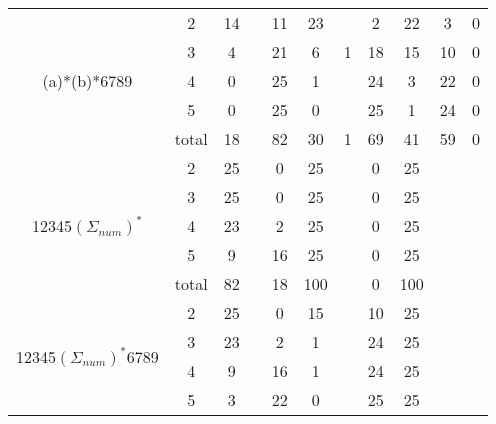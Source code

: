 \begin{table*}[]
\begin{tabular}{c|c|ccc|ccc|ccc}
    \multirow{5}{*}{(a)*(b)*6789}                      & 2   & 14   &        & 11      & 23    &        & 2        & 22  & 3     & 0                    \\
                                                       & 3   & 4    &        & 21      & 6     & 1      & 18       & 15  & 10    & 0                    \\
                                                       & 4   & 0    &        & 25      & 1     &        & 24       & 3   & 22    & 0                    \\
                                                       & 5   & 0    &        & 25      & 0     &        & 25       & 1   & 24    & 0                    \\
                                                       & total & 18   &        & 82      & 30    & 1      & 69       & 41  & 59    & 0                    \\ \hline\hline
    \multirow{5}{*}{12345$(\Sigma_{num})^*$}     & 2   & 25   &        & 0       & 25    &        & 0        & 25  &       &                      \\
                                                       & 3   & 25   &        & 0       & 25    &        & 0        & 25  &       &                      \\
                                                       & 4   & 23   &        & 2       & 25    &        & 0        & 25  &       &                      \\
                                                       & 5   & 9    &        & 16      & 25    &        & 0        & 25  &       &                      \\
                                                       & total & 82   &        & 18      & 100   &        & 0        & 100 &       &                      \\ \hline
    \multirow{5}{*}{12345$(\Sigma_{num})^*$6789} & 2   & 25   &        & 0       & 15    &        & 10       & 25  &       & \multicolumn{1}{l}{} \\
                                                       & 3   & 23   &        & 2       & 1     &        & 24       & 25  &       & \multicolumn{1}{l}{} \\
                                                       & 4   & 9    &        & 16      & 1     &        & 24       & 25  &       & \multicolumn{1}{l}{} \\
                                                       & 5   & 3    &        & 22      & 0     &        & 25       & 25  &       &                      \\

\end{tabular}
\end{table*}
